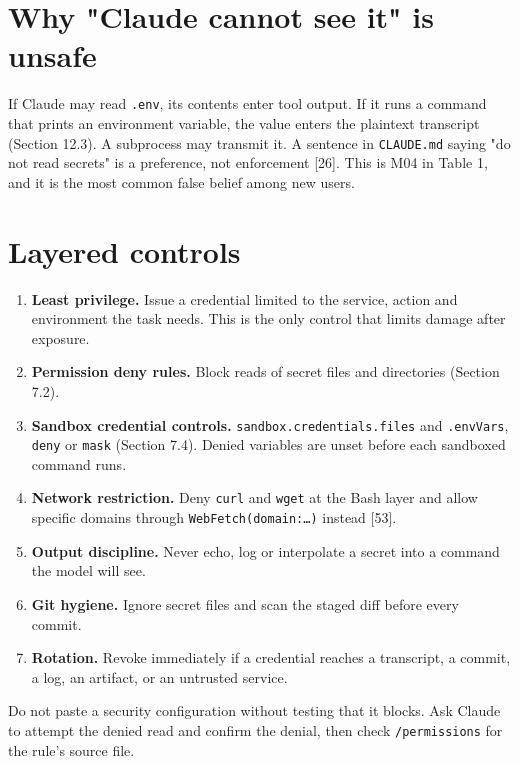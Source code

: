 \documentclass[11pt,a4paper,twoside,openany]{book}
\begin{document}
\FloatBarrier
\setcounter{section}{0}
\section{Why "Claude cannot see it" is unsafe}

If Claude may read \texttt{.\allowbreak{}env}, its contents enter tool output. If it runs a command that prints an environment variable, the value enters the plaintext transcript (Section 12.3). A subprocess may transmit it. A sentence in \texttt{CLAUDE.\allowbreak{}md} saying "do not read secrets" is a preference, not enforcement [26]. This is M04 in Table 1, and it is the most common false belief among new users.


\FloatBarrier
\setcounter{section}{1}
\section{Layered controls}

\begin{enumerate}
\item \textbf{Least privilege.} Issue a credential limited to the service, action and environment the task needs. This is the only control that limits damage after exposure.
\item \textbf{Permission deny rules.} Block reads of secret files and directories (Section 7.2).
\item \textbf{Sandbox credential controls.} \texttt{sandbox.\allowbreak{}credentials.\allowbreak{}files} and \texttt{.\allowbreak{}env\allowbreak{}Vars}, \texttt{deny} or \texttt{mask} (Section 7.4). Denied variables are unset before each sandboxed command runs.
\item \textbf{Network restriction.} Deny \texttt{curl} and \texttt{wget} at the Bash layer and allow specific domains through \texttt{Web\allowbreak{}Fetch(domai\allowbreak{}n:\allowbreak{}…)} instead [53].
\item \textbf{Output discipline.} Never echo, log or interpolate a secret into a command the model will see.
\item \textbf{Git hygiene.} Ignore secret files and scan the staged diff before every commit.
\item \textbf{Rotation.} Revoke immediately if a credential reaches a transcript, a commit, a log, an artifact, or an untrusted service.
\end{enumerate}

Do not paste a security configuration without testing that it blocks. Ask Claude to attempt the denied read and confirm the denial, then check \texttt{/\allowbreak{}permissions} for the rule's source file.
\end{document}
